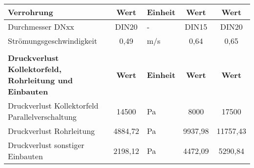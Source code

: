 \begin{table}[]
{\begin{tabular}{lclcc}
    \multicolumn{1}{|l|}{\textbf{Verrohrung}}                                            & \multicolumn{1}{c|}{\cellcolor[HTML]{9AFF99}\textbf{Wert}} & \multicolumn{1}{l|}{\cellcolor[HTML]{9AFF99}\textbf{Einheit}} & \multicolumn{1}{c|}{\textbf{Wert}}            & \multicolumn{1}{c|}{\textbf{Wert}}            \\ \hline
    \multicolumn{1}{|l|}{Durchmesser DNxx}                                               & \multicolumn{1}{c|}{\cellcolor[HTML]{9AFF99}DIN20}         & \multicolumn{1}{l|}{\cellcolor[HTML]{9AFF99}-}                & \multicolumn{1}{c|}{DIN15}                    & \multicolumn{1}{c|}{DIN20}                    \\ \hline
    \multicolumn{1}{|l|}{Strömungsgeschwindigkeit}                                       & \multicolumn{1}{c|}{\cellcolor[HTML]{9AFF99}0,49}          & \multicolumn{1}{l|}{\cellcolor[HTML]{9AFF99}m/s}              & \multicolumn{1}{c|}{0,64}                     & \multicolumn{1}{c|}{0,65}                     \\ \hline
                                                                                         & \cellcolor[HTML]{9AFF99}                                   & \cellcolor[HTML]{9AFF99}                                      &                                               &                                               \\ \hline
    \multicolumn{1}{|l|}{\textbf{Druckverlust Kollektorfeld, Rohrleitung und Einbauten}} & \multicolumn{1}{c|}{\cellcolor[HTML]{9AFF99}\textbf{Wert}} & \multicolumn{1}{l|}{\cellcolor[HTML]{9AFF99}\textbf{Einheit}} & \multicolumn{1}{c|}{\textbf{Wert}}            & \multicolumn{1}{c|}{\textbf{Wert}}            \\ \hline
    \multicolumn{1}{|l|}{Druckverlust Kollektorfeld Parallelverschaltung}                & \multicolumn{1}{c|}{\cellcolor[HTML]{9AFF99}14500}         & \multicolumn{1}{l|}{\cellcolor[HTML]{9AFF99}Pa}               & \multicolumn{1}{c|}{8000}                     & \multicolumn{1}{c|}{17500}                    \\ \hline
    \multicolumn{1}{|l|}{Druckverlust Rohrleitung}                                       & \multicolumn{1}{c|}{\cellcolor[HTML]{9AFF99}4884,72}       & \multicolumn{1}{l|}{\cellcolor[HTML]{9AFF99}Pa}               & \multicolumn{1}{c|}{9937,98}                  & \multicolumn{1}{c|}{11757,43}                 \\ \hline
    \multicolumn{1}{|l|}{Druckverlust sonstiger Einbauten}                               & \multicolumn{1}{c|}{\cellcolor[HTML]{9AFF99}2198,12}       & \multicolumn{1}{l|}{\cellcolor[HTML]{9AFF99}Pa}               & \multicolumn{1}{c|}{4472,09}                  & \multicolumn{1}{c|}{5290,84}                  \\ \hline

\end{tabular}}
\end{table}
